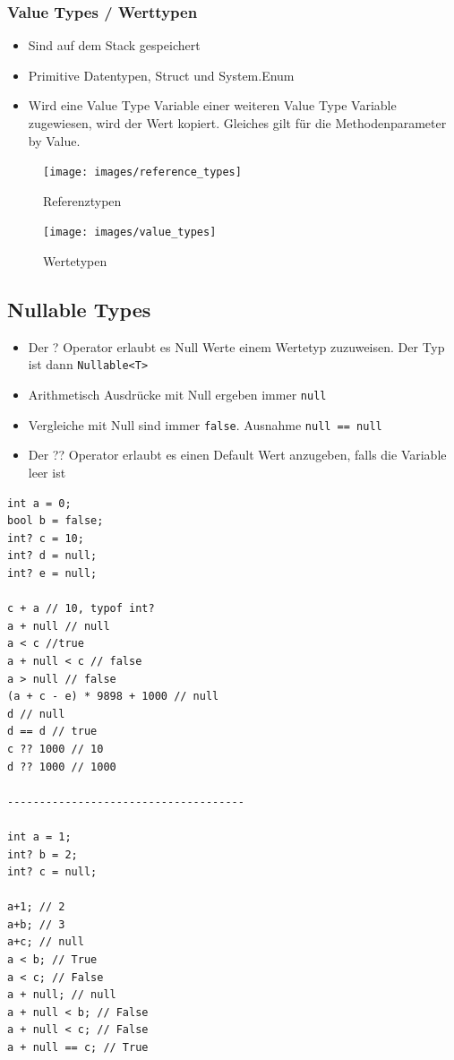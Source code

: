 \subsubsection{Value Types / Werttypen}
\begin{itemize}
	\item Sind auf dem Stack gespeichert
	\item Primitive Datentypen, Struct und System.Enum
	\item Wird eine Value Type Variable einer weiteren Value Type Variable zugewiesen, wird der Wert kopiert. Gleiches gilt für die Methodenparameter by Value.
\end{itemize}

\begin{figure}[ht!]
	\centering
	\begin{minipage}[t]{0.4\textwidth}
		\centering
		\texttt{[image: images/reference\_types]}
		\caption{Referenztypen}
		\label{fig:searchtreeinsert1}
	\end{minipage}
	\begin{minipage}[t]{0.4\textwidth}
		\centering
		\texttt{[image: images/value\_types]}
		\caption{Wertetypen}
		\label{fig:searchtreeinsert2}
	\end{minipage}
\end{figure}

\clearpage

\subsection{Nullable Types}
\begin{itemize}
	\item Der ? Operator erlaubt es Null Werte einem Wertetyp zuzuweisen. Der Typ ist dann \lstinline|Nullable<T>|
	\item Arithmetisch Ausdrücke mit Null ergeben immer \lstinline|null|
	\item Vergleiche mit Null sind immer \lstinline|false|. Ausnahme \lstinline|null == null|
	\item Der ?? Operator erlaubt es einen Default Wert anzugeben, falls die Variable leer ist
\end{itemize}
\begin{lstlisting}
int a = 0;
bool b = false;
int? c = 10;
int? d = null;
int? e = null;

c + a // 10, typof int?
a + null // null
a < c //true
a + null < c // false
a > null // false
(a + c - e) * 9898 + 1000 // null
d // null
d == d // true
c ?? 1000 // 10
d ?? 1000 // 1000

-------------------------------------

int a = 1;
int? b = 2;
int? c = null;

a+1; // 2
a+b; // 3
a+c; // null
a < b; // True
a < c; // False
a + null; // null
a + null < b; // False
a + null < c; // False
a + null == c; // True
\end{lstlisting}

